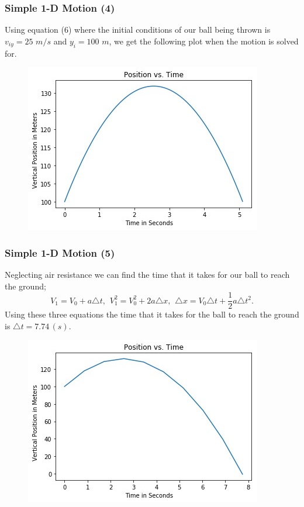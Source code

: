 \documentclass{beamer}
\begin{document}
\begin{frame}
\frametitle{Simple 1-D Motion (4)}
Using equation (6) where the initial conditions of our ball being thrown is $v_{iy}=25$ $m/s$ and $y_{i}=100$ $m$, we get the following plot when the motion is solved for.
\begin{figure}[htbp]
\begin{center}
\includegraphics[width=0.75\linewidth]{1DMotion1.jpg}
\end{center}
\end{figure}
\end{frame}
\begin{frame}
\frametitle{Simple 1-D Motion (5)}
Neglecting air resistance we can find the time that it takes for our ball to reach the ground;
\begin{equation}\label{7}
V_{1}=V_{0}+a\triangle t, \hspace{5pt} V_{1}^2=V_{0}^2+2a\triangle x, \hspace{5pt} \triangle x = V_{0}\triangle t + \frac{1}{2}a\triangle t^2.
\end{equation}
Using these three equations the time that it takes for the ball to reach the ground is $\triangle t = 7.74 \hspace{2pt} (s)$.
\begin{figure}[htbp]
\begin{center}
\includegraphics[width=0.70\linewidth]{1DMotion2.jpg}
\end{center}
\end{figure}
\end{frame}
\end{document}
